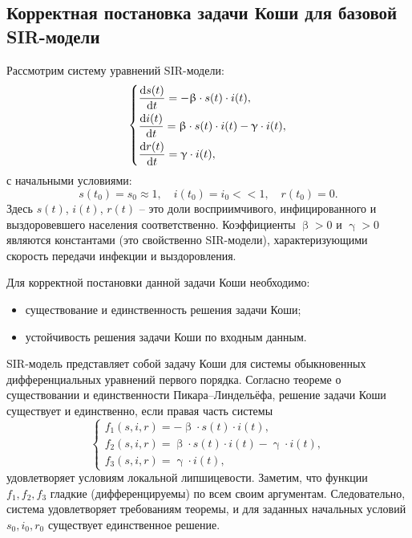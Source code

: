 \documentclass[a4paper, 14pt]{extreport}
\renewcommand{\beta}{\upbeta}
\renewcommand{\gamma}{\upgamma}
\begin{document}
	\subsection{Корректная постановка задачи Коши для базовой SIR-модели} 
	Рассмотрим систему уравнений SIR-модели:
	\[
	\begin{dcases}
		\dfrac{\mathrm{d}s(t)}{\mathrm{d}t} = -\beta \cdot s(t) \cdot i(t),\\
		\dfrac{\mathrm{d}i(t)}{\mathrm{d}t} = \beta \cdot s(t) \cdot i(t) - \gamma \cdot i(t),\\
		\dfrac{\mathrm{d}r(t)}{\mathrm{d}t} = \gamma \cdot i(t),
	\end{dcases}
	\]
	с начальными условиями:
	\[
	s(t_0) = s_0 \approx 1, \quad i(t_0) = i_0 << 1, \quad r(t_0) = 0.
	\]
	Здесь \( s(t) \), \( i(t) \), \( r(t) \) -- это доли восприимчивого, инфицированного и выздоровевшего населения соответственно. Коэффициенты \( \beta > 0 \) и \( \gamma > 0 \) являются константами (это свойственно SIR-модели), характеризующими скорость передачи инфекции и выздоровления.
	
	Для корректной постановки данной задачи Коши необходимо:
	\begin{itemize}
		\item существование и единственность решения задачи Коши;
		\item устойчивость решения задачи Коши по входным данным.
	\end{itemize}
	
	SIR-модель представляет собой задачу Коши для системы обыкновенных дифференциальных уравнений первого порядка. Согласно теореме о существовании и единственности Пикара–Линдельёфа, решение задачи Коши существует и единственно, если правая часть системы
	\[
	\begin{cases}
		f_1(s, i, r) = -\beta \cdot s(t)\cdot  i(t),\\
		f_2(s, i, r) = \beta \cdot s(t)\cdot  i(t) - \gamma \cdot i(t),\\
		f_3(s, i, r) = \gamma\cdot  i(t),
	\end{cases}
	\]
	удовлетворяет условиям локальной липшицевости. Заметим, что функции \( f_1, f_2, f_3 \) гладкие (дифференцируемы) по всем своим аргументам. Следовательно, система удовлетворяет требованиям теоремы, и для заданных начальных условий \( s_0, i_0, r_0 \) существует единственное решение.
	
\end{document}
